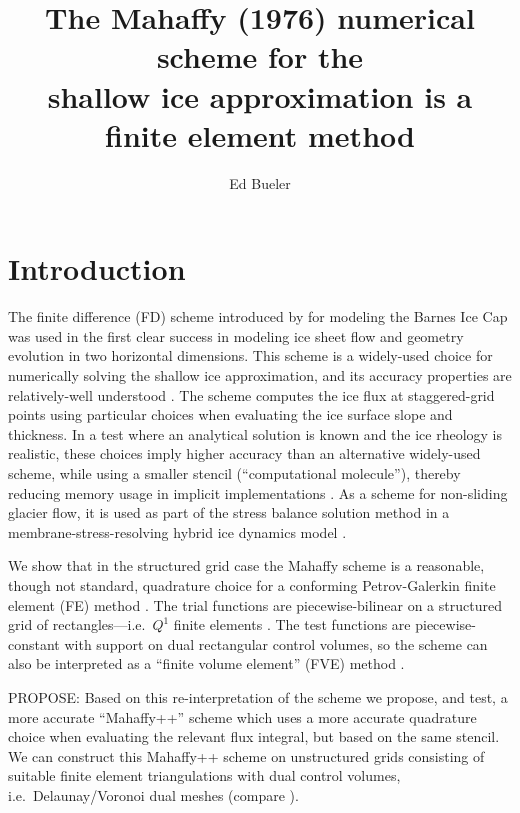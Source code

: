 \documentclass[11pt]{amsart}
\title[The Mahaffy scheme is a finite element method]{The Mahaffy (1976) numerical scheme for the \\ shallow ice approximation is a finite element method}
\author{Ed Bueler}
\begin{document}

\maketitle

\thispagestyle{empty}


\section{Introduction}

The finite difference (FD) scheme introduced by \cite{Mahaffy1976} for modeling the Barnes Ice Cap was used in the first clear success in modeling ice sheet flow and geometry evolution in two horizontal dimensions.  This scheme is a widely-used choice for numerically solving the shallow ice approximation, and its accuracy properties are relatively-well understood \cite{Bueleretal2005}.   The scheme computes the ice flux at staggered-grid points using particular choices when evaluating the ice surface slope and thickness.  In a test where an analytical solution is known and the ice rheology is realistic, these choices imply higher accuracy than an alternative widely-used scheme, while using a smaller stencil (``computational molecule''), thereby reducing memory usage in implicit implementations \cite{HindmarshPayne1996}.  As a scheme for non-sliding glacier flow, it is used as part of the stress balance solution method in a membrane-stress-resolving hybrid ice dynamics model \cite{BuelerBrown2009}.

We show that in the structured grid case the Mahaffy scheme is a reasonable, though not standard, quadrature choice for a conforming Petrov-Galerkin finite element (FE) method \cite{Elmanetal2005}.  The trial functions are piecewise-bilinear on a structured grid of rectangles---i.e.~$Q^1$ finite elements \cite{Elmanetal2005}.  The test functions are piecewise-constant with support on dual rectangular control volumes, so the scheme can also be interpreted as a ``finite volume element'' (FVE) method \cite{EwingLinLin2002}.

PROPOSE: Based on this re-interpretation of the scheme we propose, and test, a more accurate ``Mahaffy++'' scheme which uses a more accurate quadrature choice when evaluating the relevant flux integral, but based on the same stencil.  We can construct this Mahaffy++ scheme on unstructured grids consisting of suitable finite element triangulations with dual control volumes, i.e.~Delaunay/Voronoi dual meshes (compare \cite{Ringleretal2013}).
\end{document}
